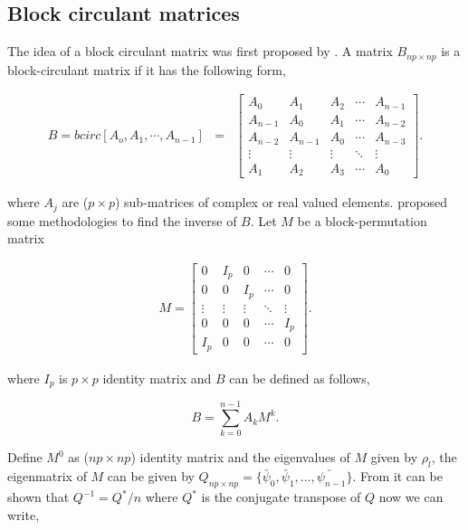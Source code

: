 \subsection{Block circulant matrices}

The idea of a block circulant matrix was first proposed by \cite{Muir1920}. A matrix $B_{np\times np}$ is a block-circulant matrix if it has the following form,


\begin{eqnarray}
	B = bcirc[A_o, A_1,\cdots,A_{n-1}] &=& \left[
		\begin{array}{lllll}
			A_0     & A_1     & A_2    & \cdots & A_{n-1} \\
			A_{n-1} & A_0     & A_1    & \cdots & A_{n-2} \\
			A_{n-2} & A_{n-1} & A_0    & \cdots & A_{n-3} \\
			\vdots  & \vdots  & \vdots & \ddots & \vdots  \\
			A_1     & A_2     & A_3    & \cdots & A_0
		\end{array}
	\right].
\end{eqnarray}

where $A_j$ are ($p \times p$) sub-matrices of complex or real valued elements. \cite{DeMazancourt1983} proposed some methodologies to find the inverse of $B$. Let $M$ be a block-permutation matrix

\begin{eqnarray*}
	M = \left[
		\begin{array}{lllll}
			0       & I_p     & 0      & \cdots & 0 \\
			0       & 0       & I_p    & \cdots & 0 \\
			\vdots  & \vdots  & \vdots & \ddots & \vdots  \\
			0       & 0       & 0      & \cdots & I_p \\
			I_p     & 0     & 0    & \cdots & 0
		\end{array}
	\right].
\end{eqnarray*}

where $I_p$ is $p\times p$ identity matrix and $B$ can be defined as follows,

\[
B = \sum_{k=0}^{n-1} A_k M^k.
\]

Define $M^0$ as ($np\times np$) identity matrix and the eigenvalues of $M$ given by $\rho_l$, the eigenmatrix of $M$ can be given by $Q_{np\times np}=\{ \utilde{\psi_0}, \utilde{\psi_1},\ldots, \utilde{\psi_{n-1}} \}$. From \cite{Trapp1973} it can be shown that $Q^{-1} = Q^*/n$ where $Q^*$ is the conjugate transpose of $Q$ now we can write,

